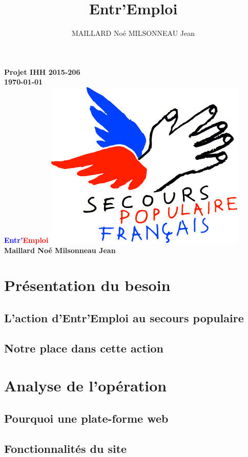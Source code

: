 \documentclass{report}
\title{Entr'Emploi}
\author{MAILLARD Noé MILSONNEAU Jean}
\begin{document}
\begin{titlepage}
    \centering
    {\bfseries\Large
        Projet IHH 2015-206\\
        \today\\
        \vskip2cm
        \Huge
        \textcolor{blue}{Entr'}\textcolor{red}{Emploi}
        \Large
        \includegraphics{../../public/images/Logo-spf.png}
        \vskip2cm
        Maillard Noé Milsonneau Jean\\
    }    
    \normalsize
\end{titlepage}

\tableofcontents

 
\chapter{Présentation du besoin}
\section{L'action d'Entr'Emploi au secours populaire}
\section{Notre place dans cette action}

\chapter{Analyse de l’opération}
\section{Pourquoi une plate-forme web}
\section{Fonctionnalités du site}
\end{document}
